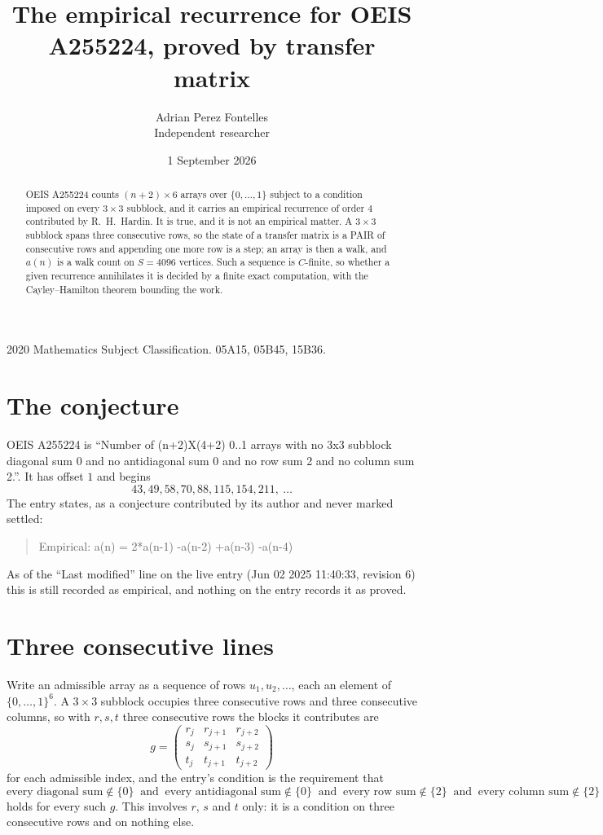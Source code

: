\documentclass[11pt,a4paper]{article}
\title{The empirical recurrence for OEIS A255224, proved by transfer matrix}
\author{Adrian Perez Fontelles\\ \small Independent researcher}
\date{1 September 2026}
\theoremstyle{plain}
\theoremstyle{definition}
\begin{document}
\maketitle

\begin{abstract}
OEIS A255224 counts $(n+2)\times6$ arrays over $\{0,\dots,1\}$ subject to a condition imposed on
every $3\times3$ subblock, and it carries an empirical recurrence of order $4$
contributed by R.~H.~Hardin. It is true, and it is not an empirical matter. A $3\times3$
subblock spans three consecutive rows, so the state of a transfer matrix is a PAIR of
consecutive rows and appending one more row is a step; an array is then a walk, and
$a(n)$ is a walk count on $S=4096$ vertices. Such a sequence is $C$-finite, so whether a given
recurrence annihilates it is decided by a finite exact computation, with the Cayley--Hamilton
theorem bounding the work.
\end{abstract}

\noindent\small 2020 Mathematics Subject Classification. 05A15, 05B45, 15B36.\normalsize

\section{The conjecture}

OEIS A255224 is ``Number of (n+2)X(4+2) 0..1 arrays with no 3x3 subblock diagonal sum 0 and no antidiagonal sum 0 and no row sum 2 and no column sum 2.''. It has offset $1$ and begins
\[
43, 49, 58, 70, 88, 115, 154, 211,\ \dots
\]
The entry states, as a conjecture contributed by its author and never marked settled:
\begin{quote}
Empirical: a(n) = 2*a(n-1) -a(n-2) +a(n-3) -a(n-4)
\end{quote}
As of the ``Last modified'' line on the live entry (Jun 02 2025 11:40:33, revision 6) this is still
recorded as empirical, and nothing on the entry records it as proved.

\section{Three consecutive lines}

Write an admissible array as a sequence of rows $u_1,u_2,\dots$, each an element of
$\{0,\dots,1\}^{6}$. A $3\times3$ subblock occupies three consecutive rows and
three consecutive columns, so with $r,s,t$ three consecutive rows the blocks it
contributes are
\[
g=\begin{pmatrix}r_j&r_{j+1}&r_{j+2}\\ s_j&s_{j+1}&s_{j+2}\\ t_j&t_{j+1}&t_{j+2}\end{pmatrix}
\]
for each admissible index, and the entry's condition is the requirement that
\[
\text{every diagonal sum} \notin \{0\}\ \text{ and }\ \text{every antidiagonal sum} \notin \{0\}\ \text{ and }\ \text{every row sum} \notin \{2\}\ \text{ and }\ \text{every column sum} \notin \{2\}
\]
holds for every such $g$. This involves $r$, $s$ and $t$ only: it is a condition on
three consecutive rows and on nothing else.
\end{document}
